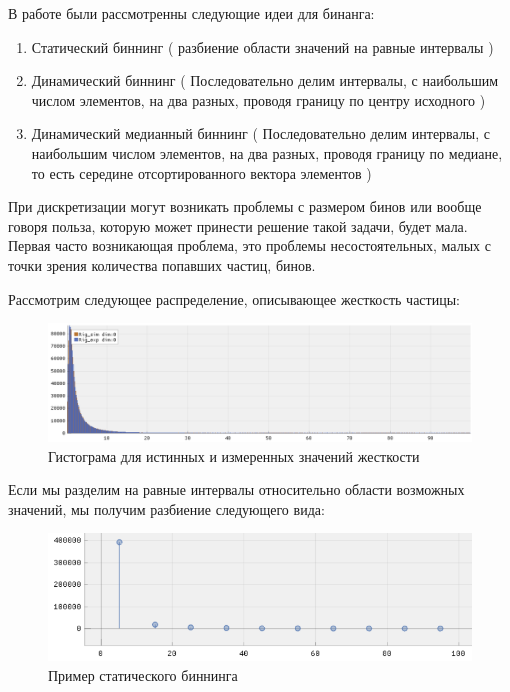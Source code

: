 \documentclass[a4paper,12pt]{diplom}
\begin{document}
В работе были рассмотренны следующие идеи для бинанга:

\begin{enumerate}
   \item Статический биннинг ( разбиение области значений на равные интервалы ) \\
   
   \item Динамический биннинг ( Последовательно делим интервалы, с наибольшим числом элементов, 
   на два разных, проводя границу по центру исходного ) \\

   \item Динамический медианный биннинг ( Последовательно делим интервалы, с наибольшим числом элементов, 
   на два разных, проводя границу по медиане, то есть середине отсортированного вектора элементов )
\end{enumerate}


При дискретизации могут возникать проблемы с размером бинов или вообще говоря польза, которую может принести решение такой задачи, будет мала. 
Первая часто возникающая проблема, это проблемы несостоятельных, малых с точки зрения количества попавших частиц, бинов. 

Рассмотрим следующее распределение, описывающее жесткость частицы:

\begin{figure}[h!]
   \centering
   \includegraphics[width=\linewidth]{images/rig_dist.png}
   \caption{Гистограма для истинных и измеренных значений жесткости}
   \label{photo:rig_dist}
\end{figure}

Если мы разделим на равные интервалы относительно области возможных значений, мы получим разбиение следующего вида:

\clearpage

\begin{figure}[h!]
   \centering
   \includegraphics[width=\linewidth]{images/rig_static_binning.png}
   \caption{Пример статического биннинга}
   \label{fig:coffee}
\end{figure}
\end{document}
